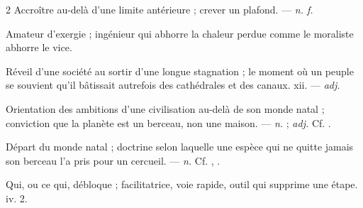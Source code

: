 \begin{multicols}{2}
 Accroître au-delà d'une limite antérieure ; crever un plafond.  —  \textit{n. f.}

 Amateur d'exergie ; ingénieur qui abhorre la chaleur perdue comme le moraliste abhorre le vice.

 Réveil d'une société au sortir d'une longue stagnation ; le moment où un peuple se souvient qu'il bâtissait autrefois des cathédrales et des canaux.   xii. —  \textit{adj.}

 Orientation des ambitions d'une civilisation au-delà de son monde natal ; conviction que la planète est un berceau, non une maison. —  \textit{n.} ;  \textit{adj.} Cf. .

 Départ du monde natal ; doctrine selon laquelle une espèce qui ne quitte jamais son berceau l'a pris pour un cercueil. —  \textit{n.} Cf. , .

 Qui, ou ce qui, débloque ; facilitatrice, voie rapide, outil qui supprime une étape.   iv. 2.

\end{multicols}

